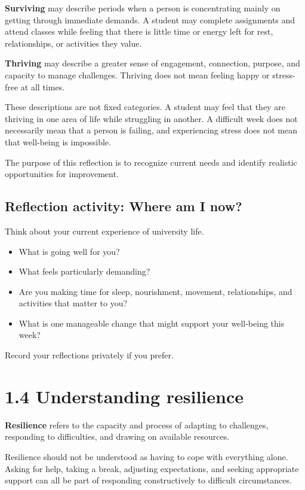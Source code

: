 \documentclass[
  letterpaper,
]{book}
\providecommand{\tightlist}{%
  \setlength{\itemsep}{0pt}\setlength{\parskip}{0pt}}
\begin{document}
\textbf{Surviving} may describe periods when a person is concentrating
mainly on getting through immediate demands. A student may complete
assignments and attend classes while feeling that there is little time
or energy left for rest, relationships, or activities they value.

\textbf{Thriving} may describe a greater sense of engagement,
connection, purpose, and capacity to manage challenges. Thriving does
not mean feeling happy or stress-free at all times.

These descriptions are not fixed categories. A student may feel that
they are thriving in one area of life while struggling in another. A
difficult week does not necessarily mean that a person is failing, and
experiencing stress does not mean that well-being is impossible.

The purpose of this reflection is to recognize current needs and
identify realistic opportunities for improvement.

\subsection{Reflection activity: Where am I
now?}\label{reflection-activity-where-am-i-now}

Think about your current experience of university life.

\begin{itemize}
\tightlist
\item
  What is going well for you?
\item
  What feels particularly demanding?
\item
  Are you making time for sleep, nourishment, movement, relationships,
  and activities that matter to you?
\item
  What is one manageable change that might support your well-being this
  week?
\end{itemize}

Record your reflections privately if you prefer.

\section{1.4 Understanding resilience}\label{understanding-resilience}

\textbf{Resilience} refers to the capacity and process of adapting to
challenges, responding to difficulties, and drawing on available
resources.

Resilience should not be understood as having to cope with everything
alone. Asking for help, taking a break, adjusting expectations, and
seeking appropriate support can all be part of responding constructively
to difficult circumstances.
\end{document}
